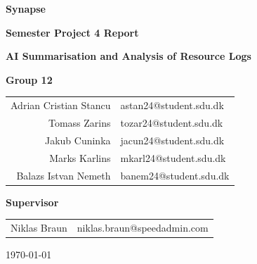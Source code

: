 \documentclass[12pt, a4paper]{article}
\begin{document}
\begin{titlepage}
    \centering
    \vspace*{2cm}

    {\Huge\bfseries Synapse \par}
    \vfill
    {\Large\bfseries Semester Project 4 Report \par}
    {\large\bfseries AI Summarisation and Analysis of Resource Logs \par}
    \vspace{1.5cm}

    \vfill
    {\Large \textbf{Group 12}} \\
    \vspace{0.25cm}
    \begin{tabular}{r | l}
        Adrian Cristian Stancu & astan24@student.sdu.dk \\
        Tomass Zarins          & tozar24@student.sdu.dk \\
        Jakub Cuninka          & jacun24@student.sdu.dk \\
        Marks Karlins          & mkarl24@student.sdu.dk \\
        Balazs Istvan Nemeth   & banem24@student.sdu.dk \\
    \end{tabular}
    \vspace{1cm}

    {\Large \textbf{Supervisor}} \\
    \vspace{0.25cm}
    \begin{tabular}{r | l}
        Niklas Braun & niklas.braun@speedadmin.com \\
    \end{tabular}

    \vfill
    {\large \today}
\end{titlepage}

\tableofcontents
\listoffigures
\newpage










\end{document}
